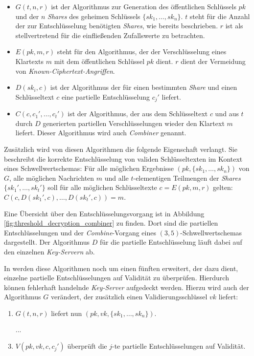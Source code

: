 \begin{itemize}
  \item \(G(t, n, r)\) ist der Algorithmus zur Generation des öffentlichen Schlüssels \(pk\) und der \(n\) \textit{Shares} des geheimen Schlüssels \(\{sk_1, \dots, sk_n\}\). \(t\) steht für die Anzahl der zur Entschlüsselung benötigten \textit{Shares}, wie bereits beschrieben. \(r\) ist als stellvertretend für die einfließenden Zufallswerte zu betrachten.
  
  \item \(E(pk, m, r)\) steht für den Algorithmus, der der Verschlüsselung eines Klartexts \(m\) mit dem öffentlichen Schlüssel \(pk\) dient. \(r\) dient der Vermeidung von \textit{Known-Ciphertext-Angriffen}. 
  
  \item \(D(sk_i, c)\) ist der Algorithmus der für einen bestimmten \textit{Share} und einen Schlüsseltext \(c\) eine partielle Entschlüsselung \(c_j'\) liefert.
  
  \item \(C(c, c_1', \dots, c_t')\) ist der Algorithmus, der aus dem Schlüsseltext \(c\) und aus \(t\) durch \(D\) generierten partiellen Verschlüsselungen wieder den Klartext \(m\) liefert. Dieser Algorithmus wird auch \textit{Combiner} genannt. 
\end{itemize}

Zusätzlich wird von diesen Algorithmen die folgende Eigenschaft verlangt. Sie beschreibt die korrekte Entschlüsselung von validen Schlüsseltexten im Kontext eines Schwellwertschemas: Für alle möglichen Ergebnisse \((pk, \{sk_1, \dots, sk_n\})\) von \(G\), alle möglichen Nachrichten \(m\) und alle \(t\)-elementigen Teilmengen der \textit{Shares} \(\{sk_1', \dots, sk_t'\}\) soll für alle möglichen Schlüsseltexte \(c=E(pk, m, r)\) gelten: \(C(c, D(sk_1', c), \dots, D(sk_t', c)) = m\).

Eine Übersicht über den Entschlüsselungsvorgang ist in Abbildung \ref{fig:threshold_decryption_combiner} zu finden. Dort sind die partiellen Entschlüsselungen und der \textit{Combine}-Vorgang eines \((3,5)\)-Schwellwertschemas dargestellt. Der Algorithmus \(D\) für die partielle Entschlüsselung läuft dabei auf den einzelnen \textit{Key-Servern} ab.

In \cite{boneh2006} werden diese Algorithmen noch um einen fünften erweitert, der dazu dient, einzelne partielle Entschlüsselungen auf Validität zu überprüfen. Hierdurch können fehlerhaft handelnde \textit{Key-Server} aufgedeckt werden. Hierzu wird auch der Algorithmus \(G\) verändert, der zusätzlich einen Validierungsschlüssel \(vk\) liefert:
\begin{enumerate}
	\item \(G(t, n, r)\) liefert nun \((pk, vk, \{sk_1, \dots, sk_n\})\).
  \item[...] 
  \setcounter{enumi}{4}
	\item \(V(pk, vk, c, c_j')\) überprüft die \(j\)-te partielle Entschlüsselungen auf Validität.
\end{enumerate}


